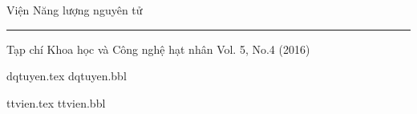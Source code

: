 \documentclass[11pt, a4paper, bold, center, twoside, noheadline, journal]{paper}%
\newcommand{\clearHeading}{%
	\clearpage
	\thispagestyle{empty}	
	\cleardoublepage      
}
\begin{document}
\renewcommand{\contentsname}{Danh sách các bài báo}%
\renewcommand{\abstractname}{Tóm tắt}%
\renewcommand{\keywordname}{\textbf{Từ khóa}}%
\renewcommand{\figureshortname}{Hình}%
\renewcommand{\tableshortname}{Bảng}%
\renewcommand{\refname}{Tài liệu tham khảo}%

\begin{titlepage} %
	\begin{center}
		\bfseries
		{\Large Viện Năng lượng nguyên tử\\
		\rule{0.6\textwidth}{1.pt}} 
		\vfill
		{\Huge Tạp chí Khoa học và Công nghệ hạt nhân} 
		\vfill
		{\large Vol. 5, No.4 (2016)}
\end{center} 
\clearHeading
\end{titlepage}%


\thispagestyle{plain}%
\journalcontents
\clearHeading
{dqtuyen.tex}%
{dqtuyen.bbl}
\clearHeading

{ttvien.tex}
{ttvien.bbl}%
\clearHeading
\end{document}
